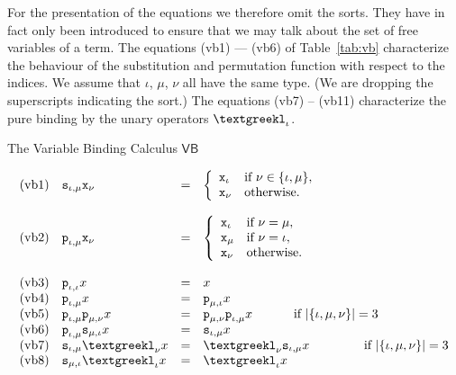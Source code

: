 \nocite{pigozzisalibra:vb}
For the presentation of the equations we therefore omit the sorts.
They have in fact only been introduced to ensure that we may talk 
about the set of free variables of a term. The equations (vb1) --- 
(vb6) of Table~\ref{tab:vb} characterize the behaviour of the 
substitution and permutation function with respect to the 
indices. We assume that $\iota$, $\mu$, $\nu$ all have the same 
type. (We are dropping the superscripts indicating the sort.)
The equations (vb7) -- (vb11) characterize the pure binding 
by the unary operators $\tlambda_{\iota}$. 
\begin{table}
\caption{The Variable Binding Calculus $\mathsf{VB}$}
\label{tab:vb}
$$\begin{array}{ll@{\quad \doteq \quad}l}
\mbox{\rm (vb1)} & 
    \mbox{\tt s}_{\iota, \mu}\mbox{\tt x}_{\nu} & \left\{\begin{array}{ll}
    \mbox{\tt x}_{\iota} & \mbox{if } \nu \in \{\iota,\mu\}, \\
    \mbox{\tt x}_{\nu}    & \mbox{otherwise.}
    \end{array}\right. \\
    \multicolumn{3}{l}{}
    \\
\mbox{\rm (vb2)} & 
\mbox{\tt p}_{\iota,\mu}\mbox{\tt x}_{\nu} & \left\{\begin{array}{ll}
    \mbox{\tt x}_{\iota} & \mbox{if } \nu = \mu, \\
    \mbox{\tt x}_{\mu} & \mbox{if } \nu = \iota, \\
    \mbox{\tt x}_{\nu}    & \mbox{otherwise.}
    \end{array}\right. \\
    \multicolumn{3}{l}{}
    \\
\mbox{\rm (vb3)} & 
\mbox{\tt p}_{\iota,\iota}x & x \\
\mbox{\rm (vb4)} & 
\mbox{\tt p}_{\iota,\mu}x & \mbox{\tt p}_{\mu,\iota}x \\
\mbox{\rm (vb5)} & 
\mbox{\tt p}_{\iota,\mu}\mbox{\tt p}_{\mu,\nu}x & 
	\mbox{\tt p}_{\mu,\nu}
    \mbox{\tt p}_{\iota,\mu} x \qquad\quad\; \mbox{if } 
	|\{\iota, \mu, \nu\}| = 3
\\
\mbox{\rm (vb6)} & 
\mbox{\tt p}_{\iota, \mu}\mbox{\tt s}_{\mu, \iota} x & 
	\mbox{\tt s}_{\iota, \mu} x \\
\mbox{\rm (vb7)} & 
\mbox{\tt s}_{\iota,\mu}\tlambda_{\nu} x &
    \tlambda_{\nu} \mbox{\tt s}_{\iota,\mu} x
    \qquad\qquad\mbox{ if } |\{\iota,\mu,\nu\}| = 3 \\
\mbox{\rm (vb8)} & 
\mbox{\tt s}_{\mu,\iota} \tlambda_{\iota} x & \tlambda_{\iota} x \\

\end{array}$$
\end{table}
